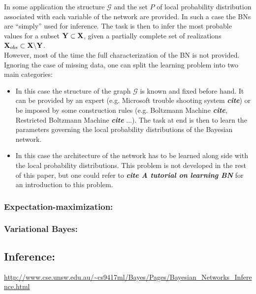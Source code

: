 \documentclass[a4paper,11pt]{report}
\begin{document}
{      In some application the structure $\mathcal{G}$ and the set $P$ of local probability distribution associated with each variable of the network are provided. In such a case the BNs are ``simply'' used for inference. The task is then to infer the most probable values for a subset ${\bf Y} \subset {\bf X}$, given a partially complete set of realizations ${\bf X}_{obs} \subset {\bf X} \backslash {\bf Y}$.\\
      
      However, most of the time the full characterization of the BN is not provided. Ignoring the case of missing data, one can split the learning problem into two main categories:
      \begin{itemize}
				\item {} In this case the structure of the graph $\mathcal{G}$ is known and fixed before hand. It can be provided by an expert (e.g. Microsoft trouble shooting system \textbf{\textit{cite}}) or be imposed by some construction rules (e.g. Boltzmann Machine \textbf{\textit{cite}}, Restricted Boltzmann Machine \textbf{\textit{cite}} ...). The task at end is then to learn the parameters governing the local probability distributions of the Bayesian network.
        \item {} In this case the architecture of the network has to be learned along side with the local probability distributions. This problem is not developed in the rest of this paper, but one could refer to \textbf{\textit{cite A tutorial on learning BN}} for an introduction to this problem.
      \end{itemize}
      
      \subsubsection{Expectation-maximization:}
      
      \subsubsection{Variational Bayes:}

    \subsection{Inference:}
      \label{subsec:PGMs/BN/Inference}
      \url{http://www.cse.unsw.edu.au/~cs9417ml/Bayes/Pages/Bayesian_Networks_Inference.html}
      
}
\end{document}

